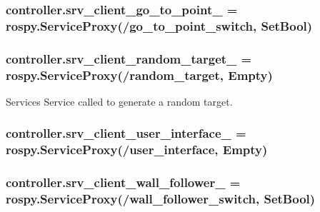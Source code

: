 \subsubsection[{\texorpdfstring{srv\+\_\+client\+\_\+go\+\_\+to\+\_\+point\+\_\+}{srv_client_go_to_point_}}]{\setlength{\rightskip}{0pt plus 5cm}controller.\+srv\+\_\+client\+\_\+go\+\_\+to\+\_\+point\+\_\+ = rospy.\+Service\+Proxy(\textquotesingle{}/go\+\_\+to\+\_\+point\+\_\+switch\textquotesingle{}, Set\+Bool)}\hypertarget{namespacecontroller_adb267b7bd1091c26caa203a40965a188}{}\label{namespacecontroller_adb267b7bd1091c26caa203a40965a188}
\subsubsection[{\texorpdfstring{srv\+\_\+client\+\_\+random\+\_\+target\+\_\+}{srv_client_random_target_}}]{\setlength{\rightskip}{0pt plus 5cm}controller.\+srv\+\_\+client\+\_\+random\+\_\+target\+\_\+ = rospy.\+Service\+Proxy(\textquotesingle{}/random\+\_\+target\textquotesingle{}, Empty)}\hypertarget{namespacecontroller_adbf0de4e6eb4bae0a6542d6314be0540}{}\label{namespacecontroller_adbf0de4e6eb4bae0a6542d6314be0540}


Services Service called to generate a random target. 

\subsubsection[{\texorpdfstring{srv\+\_\+client\+\_\+user\+\_\+interface\+\_\+}{srv_client_user_interface_}}]{\setlength{\rightskip}{0pt plus 5cm}controller.\+srv\+\_\+client\+\_\+user\+\_\+interface\+\_\+ = rospy.\+Service\+Proxy(\textquotesingle{}/user\+\_\+interface\textquotesingle{}, Empty)}\hypertarget{namespacecontroller_ad33164e09a0e6fa7ae3739d14837b1f3}{}\label{namespacecontroller_ad33164e09a0e6fa7ae3739d14837b1f3}
\subsubsection[{\texorpdfstring{srv\+\_\+client\+\_\+wall\+\_\+follower\+\_\+}{srv_client_wall_follower_}}]{\setlength{\rightskip}{0pt plus 5cm}controller.\+srv\+\_\+client\+\_\+wall\+\_\+follower\+\_\+ = rospy.\+Service\+Proxy(\textquotesingle{}/wall\+\_\+follower\+\_\+switch\textquotesingle{}, Set\+Bool)}\hypertarget{namespacecontroller_a504edbef27b5bb8d2dce7263ae16a1bd}{}\label{namespacecontroller_a504edbef27b5bb8d2dce7263ae16a1bd}
